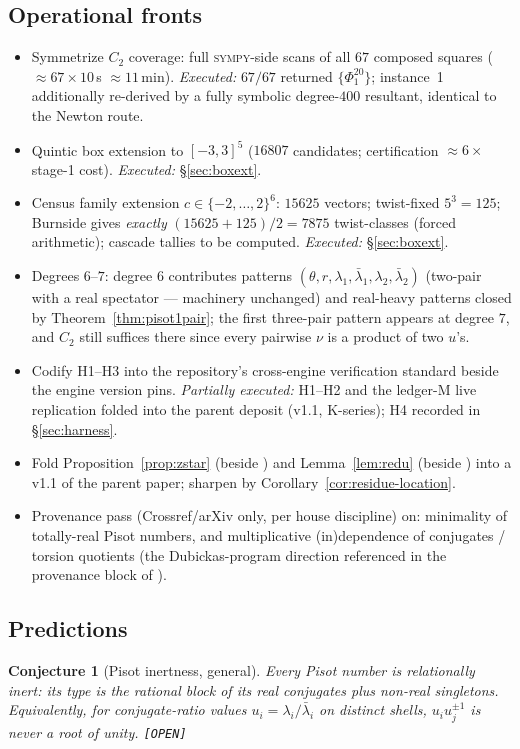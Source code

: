 \documentclass[11pt]{article}
\newcommand{\Op}{\textnormal{\texttt{[OPEN]}}}
\newcommand{\sy}{\textsc{sympy}}
\newtheorem{conjecture}[theorem]{Conjecture}
\theoremstyle{definition}
\begin{document}
\subsection{Operational fronts}
\begin{itemize}
\item[\textbf{N1.}] Symmetrize $C_2$ coverage: full \sy-side scans of all $67$
composed squares ($\approx67\times10$\,s $\approx11$\,min). \emph{Executed:}
$67/67$ returned $\{\Phi_1^{20}\}$; instance~1 additionally re-derived by a
fully symbolic degree-$400$ resultant, identical to the Newton route.
\item[\textbf{N2.}] Quintic box extension to $[-3,3]^5$ ($16807$ candidates;
certification $\approx6\times$ stage-1 cost). \emph{Executed:}
\S\ref{sec:boxext}.
\item[\textbf{N3.}] Census family extension $c\in\{-2,\dots,2\}^6$: $15625$
vectors; twist-fixed $5^3=125$; Burnside gives \emph{exactly}
$(15625+125)/2=7875$ twist-classes (forced arithmetic); cascade tallies to be
computed. \emph{Executed:} \S\ref{sec:boxext}.
\item[\textbf{N4.}] Degrees $6$--$7$: degree $6$ contributes patterns
$(\theta,r,\lambda_1,\bar\lambda_1,\lambda_2,\bar\lambda_2)$ (two-pair with a
real spectator --- machinery unchanged) and real-heavy patterns closed by
Theorem~\ref{thm:pisot1pair}; the first three-pair pattern appears at degree
$7$, and $C_2$ still suffices there since every pairwise $\nu$ is a product of
two $u$'s.
\item[\textbf{N5.}] Codify H1--H3 into the repository's cross-engine
verification standard beside the engine version pins. \emph{Partially
executed:} H1--H2 and the ledger-M live replication folded into the parent
deposit (v1.1, K-series); H4 recorded in \S\ref{sec:harness}.
\item[\textbf{N6.}] Fold Proposition~\ref{prop:zstar} (beside
\cite[Ex.~7.19]{relcharge}) and Lemma~\ref{lem:redu} (beside
\cite[Rem.~7.6]{relcharge}) into a v1.1 of the parent paper; sharpen
\cite[Cor.~7.16]{relcharge} by Corollary~\ref{cor:residue-location}.
\item[\textbf{N7.}] Provenance pass (Crossref/arXiv only, per house discipline)
on: minimality of totally-real Pisot numbers, and multiplicative
(in)dependence of conjugates / torsion quotients (the Dubickas-program
direction referenced in the provenance block of \cite{relcharge}).
\end{itemize}

\subsection{Predictions}
\begin{conjecture}[Pisot inertness, general]\label{conj:pisot}
Every Pisot number is relationally inert: its type is the rational block of its
real conjugates plus non-real singletons. Equivalently, for conjugate-ratio
values $u_i=\lambda_i/\bar\lambda_i$ on distinct shells, $u_iu_j^{\pm1}$ is
never a root of unity. \Op
\end{conjecture}
\end{document}
